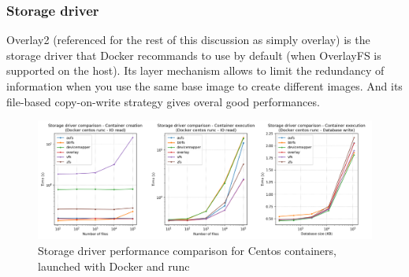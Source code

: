 \subsubsection{Storage driver}
Overlay2 (referenced for the rest of this discussion as simply overlay) is the storage driver that Docker recommands to use by default (when OverlayFS is supported on the host).  Its layer mechanism allows to limit the redundancy of information when you use the same base image to create different images.  And its file-based copy-on-write strategy gives overal good performances.

\begin{figure}[h!]
  \begin{center}
    \includegraphics[width=\linewidth]{images/question-1-storage-driver.png}
    \caption{Storage driver performance comparison for Centos containers, launched with Docker and runc}
    \label{fig:q1:storage-driver}
  \end{center}
\end{figure}

